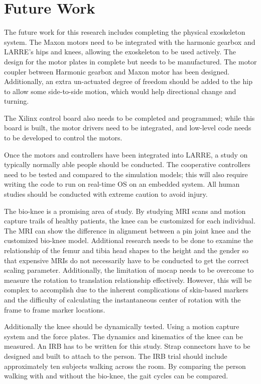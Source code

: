 \section{Future Work}

The future work for this research includes completing the physical exoskeleton system. The Maxon motors need to be integrated with the harmonic gearbox and LARRE's hips and knees, allowing the exoskeleton to be used actively. The design for the motor plates in complete but needs to be manufactured. The motor coupler between Harmonic gearbox and Maxon motor has been designed. Additionally, an extra un-actuated degree of freedom should be added to the hip to allow some side-to-side motion, which would help directional change and turning. 


The Xilinx control board also needs to be completed and programmed; while this board is built, the motor drivers need to be integrated, and low-level code needs to be developed to control the motors. 

Once the motors and controllers have been integrated into LARRE, a study on typically normally able people should be conducted. The cooperative controllers need to be tested and compared to the simulation models; this will also require writing the code to run on real-time OS on an embedded system. All human studies should be conducted with extreme caution to avoid injury. 

The bio-knee is a promising area of study. By studying MRI scans and motion capture trails of healthy patients, the knee can be customized for each individual. The MRI can show the difference in alignment between a pin joint knee and the customized bio-knee model. Additional research needs to be done to examine the relationship of the femur and tibia head shapes to the height and the gender so that expensive MRIs do not necessarily have to be conducted to get the correct scaling parameter. Additionally, the limitation of mocap needs to be overcome to measure the rotation to translation relationship effectively. However, this will be complex to accomplish due to the inherent complications of skin-based markers and the difficulty of calculating the instantaneous center of rotation with the frame to frame marker locations.  

Additionally the knee should be dynamically tested. Using a motion capture system and the force plates. The dynamics and kinematics of the knee can be measured. An IRB has to be written for this study. Strap connectors have to be designed and built to attach to the person. The IRB trial should include approximately ten subjects walking across the room. By comparing the person walking with and without the bio-knee, the gait cycles can be compared. 

